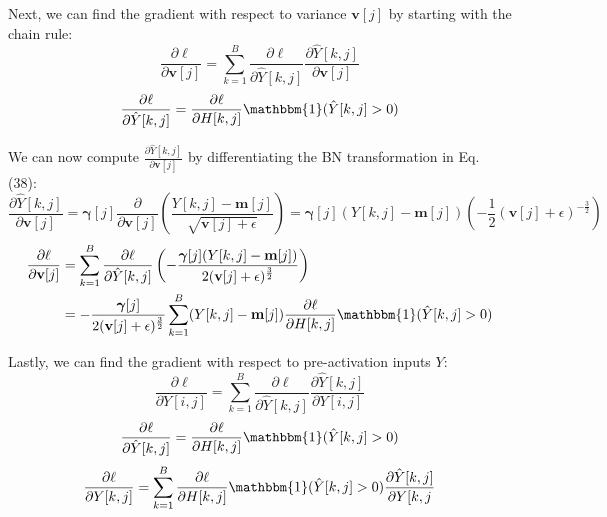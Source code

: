 \documentclass{article}
\begin{document}
{Next, we can find the gradient with respect to variance $\textbf{v}[j]$ by starting with the chain rule:
\begin{equation}
    \frac{\partial \ell}{\partial \textbf{v}[j]}= \sum_{k=1}^{B} \frac{\partial \ell}{\partial \hat{Y}[k,j]} \frac{\partial \hat{Y}[k,j]}{\partial \textbf{v}[j]}
\end{equation}
\begin{equation}
    \frac{\partial \ell}{\partial \hat{Y}[k,j]}= \frac{\partial \ell}{\partial H[k,j]} \mathbbm{1}(\hat{Y}[k,j]>0)
\end{equation}

We can now compute $\frac{\partial \hat{Y}[k,j]}{\partial \textbf{v}[j]}$ by differentiating the BN transformation in Eq. (38):
\begin{equation}
    \frac{\partial \hat{Y}[k,j]}{\partial \textbf{v}[j]}= \boldsymbol{\gamma}[j] \frac{\partial}{\partial \textbf{v}[j]} \left(\frac{Y[k,j]- \textbf{m}[j]}{\sqrt{\textbf{v}[j]+ \epsilon}} \right)= \boldsymbol{\gamma}[j] (Y[k,j]-\textbf{m}[j]) \left(-\frac{1}{2}(\textbf{v}[j]+ \epsilon)^{-\frac{3}{2}} \right)
\end{equation}
\begin{equation}
\begin{aligned}
    \frac{\partial \ell}{\partial \textbf{v}[j]}&= \sum_{k=1}^{B} \frac{\partial \ell}{\partial \hat{Y}[k,j]} \left(- \frac{\boldsymbol{\gamma}[j](Y[k,j]-\textbf{m}[j])}{2(\textbf{v}[j]+ \epsilon)^{\frac{3}{2}}} \right)\\
    &= -\frac{\boldsymbol{\gamma}[j]}{2({\textbf{v}[j]+ \epsilon})^{\frac{3}{2}}} \sum_{k=1}^{B} (Y[k,j]-\textbf{m}[j]) \frac{\partial \ell}{\partial H[k,j]} \mathbbm{1}(\hat{Y}[k,j]>0)
\end{aligned}
\end{equation}

Lastly, we can find the gradient with respect to pre-activation inputs $Y$:
\begin{equation}
    \frac{\partial \ell}{\partial Y[i,j]}= \sum_{k=1}^{B} \frac{\partial \ell}{\partial \hat{Y}[k,j]} \frac{\partial \hat{Y}[k,j]}{\partial Y[i,j]} 
\end{equation}
\begin{equation}
    \frac{\partial \ell}{\partial \hat{Y}[k,j]}= \frac{\partial \ell}{\partial H[k,j]} \mathbbm{1}(\hat{Y}[k,j]>0)
\end{equation}
\begin{equation}
    \frac{\partial \ell}{\partial Y[k,j]}= \sum_{k=1}^{B} \frac{\partial \ell}{\partial H[k,j]} \mathbbm{1}(\hat{Y}[k,j]>0) \frac{\partial \hat{Y}[k,j]}{\partial Y[k,j}
\end{equation}

}
\end{document}
